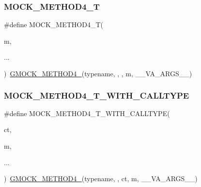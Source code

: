 \mbox{\label{_obj__test_2lib_2googletest-master_2googlemock_2include_2gmock_2gmock-generated-function-mockers_8h_a17dde4ac8109f0bf1b73e3509e42c879}} 
\subsubsection{\texorpdfstring{MOCK\_METHOD4\_T}{MOCK\_METHOD4\_T}}
{\footnotesize\ttfamily \#define M\+O\+C\+K\+\_\+\+M\+E\+T\+H\+O\+D4\+\_\+T(\begin{DoxyParamCaption}\item[{}]{m,  }\item[{}]{... }\end{DoxyParamCaption})~\mbox{\hyperlink{_obj__test_2lib_2googletest-release-1_88_81_2googlemock_2include_2gmock_2gmock-generated-function-mockers_8h_ab6430f2cfad9de4aca5258ea559294bb}{G\+M\+O\+C\+K\+\_\+\+M\+E\+T\+H\+O\+D4\+\_\+}}(typename, , , m, \+\_\+\+\_\+\+V\+A\+\_\+\+A\+R\+G\+S\+\_\+\+\_\+)}

\mbox{\label{_obj__test_2lib_2googletest-master_2googlemock_2include_2gmock_2gmock-generated-function-mockers_8h_aae18ec395b1ba3e991a25ffb997821ee}} 
\subsubsection{\texorpdfstring{MOCK\_METHOD4\_T\_WITH\_CALLTYPE}{MOCK\_METHOD4\_T\_WITH\_CALLTYPE}}
{\footnotesize\ttfamily \#define M\+O\+C\+K\+\_\+\+M\+E\+T\+H\+O\+D4\+\_\+\+T\+\_\+\+W\+I\+T\+H\+\_\+\+C\+A\+L\+L\+T\+Y\+PE(\begin{DoxyParamCaption}\item[{}]{ct,  }\item[{}]{m,  }\item[{}]{... }\end{DoxyParamCaption})~\mbox{\hyperlink{_obj__test_2lib_2googletest-release-1_88_81_2googlemock_2include_2gmock_2gmock-generated-function-mockers_8h_ab6430f2cfad9de4aca5258ea559294bb}{G\+M\+O\+C\+K\+\_\+\+M\+E\+T\+H\+O\+D4\+\_\+}}(typename, , ct, m, \+\_\+\+\_\+\+V\+A\+\_\+\+A\+R\+G\+S\+\_\+\+\_\+)}

